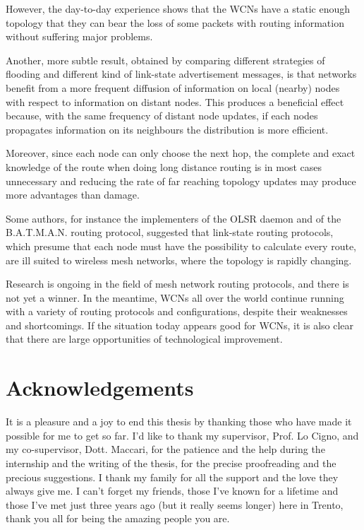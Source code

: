 \documentclass[a4paper,11pt,twoside,openright]{memoir}
\begin{document}
However, the day-to-day experience shows that the WCNs have a static enough
topology that they can bear the loss of some packets with routing information
without suffering major problems.

Another, more subtle result, obtained by comparing different strategies of
flooding and different kind of link-state advertisement messages, is that
networks benefit from a more frequent diffusion of information on local (nearby)
nodes with respect to information on distant nodes. This produces a beneficial
effect because, with the same frequency of distant node updates, if each nodes
propagates information on its neighbours the distribution is more efficient.

Moreover, since each node can only choose the next hop, the complete and exact
knowledge of the route when doing long distance routing is in most cases
unnecessary and reducing the rate of far reaching topology updates may produce
more advantages than damage.

Some authors, for instance the implementers of the OLSR daemon and of the
B.A.T.M.A.N. routing protocol, suggested that link-state routing protocols,
which presume that each node must have the possibility to calculate every
route, are ill suited to wireless mesh networks, where the topology
is rapidly changing.

Research is ongoing in the field of mesh network routing protocols, and there
is not yet a winner. In the meantime, WCNs all over the world continue
running with a variety of routing protocols and configurations, despite their
weaknesses and shortcomings.
If the situation today appears good for WCNs, it is also clear that there are
large opportunities of technological improvement.

\section{Acknowledgements}\label{acknowledgements}

It is a pleasure and a joy to end this thesis by thanking those who have made
it possible for me to get so far.
I'd like to thank my supervisor, Prof. Lo Cigno, and my co-supervisor, Dott.
Maccari, for the patience and the help during the internship and the writing of
the thesis, for the precise proofreading and the precious suggestions.
I thank my family for all the support and the love they always give me.
I can't forget my friends, those I've known for a lifetime and those I've met
just three years ago (but it really seems longer) here in Trento, thank you
all for being the amazing people you are.


 
\end{document}
